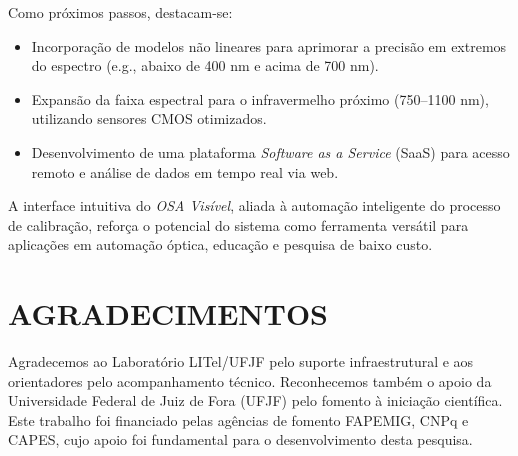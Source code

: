 \documentclass[a4paper]{ifacconf}
\begin{document}
Como próximos passos, destacam-se:  
\begin{itemize}  
    \item Incorporação de modelos não lineares para aprimorar a precisão em extremos do espectro (e.g., abaixo de 400 nm e acima de 700 nm).  
    \item Expansão da faixa espectral para o infravermelho próximo (750–1100 nm), utilizando sensores CMOS otimizados.  
    \item Desenvolvimento de uma plataforma \textit{Software as a Service} (SaaS) para acesso remoto e análise de dados em tempo real via web.
\end{itemize}  

A interface intuitiva do \textit{OSA Visível}, aliada à automação inteligente do processo de calibração, reforça o potencial do sistema como ferramenta versátil para aplicações em automação óptica, educação e pesquisa de baixo custo. 

\section{AGRADECIMENTOS}  
Agradecemos ao Laboratório LITel/UFJF pelo suporte infraestrutural e aos orientadores pelo acompanhamento técnico. Reconhecemos também o apoio da Universidade Federal de Juiz de Fora (UFJF) pelo fomento à iniciação científica. Este trabalho foi financiado pelas agências de fomento FAPEMIG, CNPq e CAPES, cujo apoio foi fundamental para o desenvolvimento desta pesquisa. 


                                                   


\end{document}
